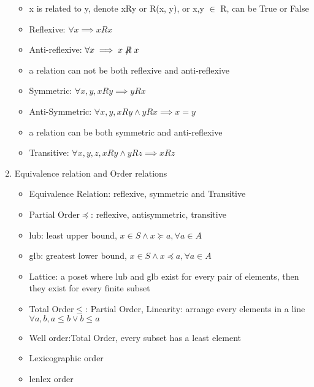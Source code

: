 \documentclass[11pt, a4paper]{article}
\begin{document}
\begin{enumerate}
\begin{itemize}
                \item x is related to y, denote xRy or R(x, y), or x,y $\in$ R, can be True or False
                \item Reflexive: $\forall x \implies xRx$
                \item Anti-reflexive: $\forall x \implies x\not \mathrel{R}x$
                \item a relation can not be both reflexive and anti-reflexive
                \item Symmetric: $\forall x,y, xRy \implies yRx$
                \item Anti-Symmetric: $\forall x,y, xRy \land yRx \implies x = y$
                \item a relation can be both symmetric and anti-reflexive
                \item Transitive: $\forall x,y,z, xRy \land yRz \implies xRz$
            \end{itemize}
        \item Equivalence relation and Order relations
            \begin{itemize}
                \item Equivalence Relation: reflexive, symmetric and Transitive
                \item Partial Order$\preceq$: reflexive, antisymmetric, transitive
                \item lub: least upper bound, $x \in S \land x \succeq a, \forall a \in A$
                \item glb: greatest lower bound, $x \in S \land x \preceq a, \forall a \in A$
                \item Lattice: a poset where lub and glb exist for every pair of elements, then they exist for every finite subset
                \item Total Order$\leq$: Partial Order, Linearity: arrange every elements in a line $\forall a,b, a \leq b \lor b \leq a$
                \item Well order:Total Order, every subset has a least element
                \item Lexicographic order
                \item lenlex order
            \end{itemize}
        \end{enumerate}
\end{document}
